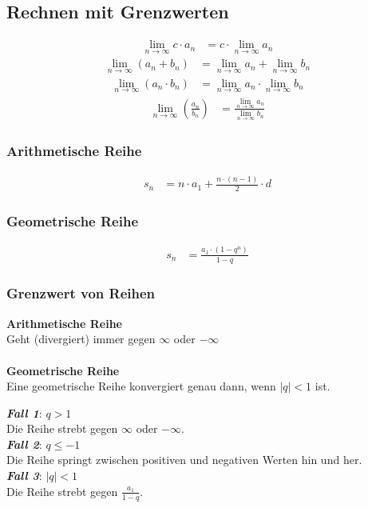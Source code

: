 \subsection{Rechnen mit Grenzwerten}
\begin{align*}
	\lim_{n \to \infty} c \cdot a_n & = c \cdot \lim_{n \to \infty} a_n
\end{align*}
\begin{align*}
	\lim_{n \to \infty} (a_n + b_n) & = \lim_{n \to \infty} a_n + \lim_{n \to \infty} b_n
\end{align*}
\begin{align*}
	\lim_{n \to \infty} (a_n \cdot b_n) & = \lim_{n \to \infty} a_n \cdot \lim_{n \to \infty} b_n
\end{align*}
\begin{align*}
	\lim_{n \to \infty}(\frac{a_n}{b_n}) & = \frac{\lim_{n \to \infty} a_n}{\lim_{n \to \infty} b_n}
\end{align*}
\subsubsection{Arithmetische Reihe}
\begin{align*}
    s_n & =n \cdot a_1 + \frac{n \cdot (n-1)}{2} \cdot d
\end{align*}
\subsubsection{Geometrische Reihe}
\begin{align*}
    s_n & = \frac{a_1 \cdot (1-q^n)}{1-q}
\end{align*}
\subsubsection{Grenzwert von Reihen}
\textbf{Arithmetische Reihe}\\
Geht (divergiert) immer gegen $\infty$ oder $-\infty$
\\
\\
\textbf{Geometrische Reihe}\\
Eine geometrische Reihe konvergiert genau dann, wenn $|q| < 1$ ist.
\begin{flushleft}
    \textit{\textbf{Fall 1}}: $q > 1$ \\
    Die Reihe strebt gegen $\infty$ oder $-\infty$. \\[0.5em]
    \textit{\textbf{Fall 2}}: $q \leq -1$ \\
    Die Reihe springt zwischen positiven und negativen Werten hin und her. \\[0.5em]
    \textit{\textbf{Fall 3}}: $|q| < 1$ \\
    Die Reihe strebt gegen $\frac{a_1}{1-q}$.
\end{flushleft}
